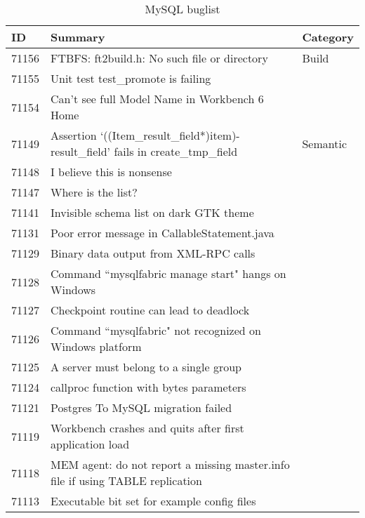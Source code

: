 \begin{longtable}[c]{p{1cm}p{10cm}p{1cm}}
\caption{MySQL buglist}
\label{tab:mysqlbuglist}\\
ID & Summary & Category \\
\endfirsthead
%
\endhead
%
71156 & FTBFS: ft2build.h: No such file or directory & Build \\
71155 & Unit test test\_promote is failing &  \\
71154 & Can't see full Model Name in Workbench 6 Home &  \\
71149 & Assertion `((Item\_result\_field*)item)-result\_field' fails in create\_tmp\_field & Semantic \\
71148 & I believe this is nonsense &  \\
71147 & Where is the list? &  \\
71141 & Invisible schema list on dark GTK theme &  \\
71131 & Poor error message in CallableStatement.java &  \\
71129 & Binary data output from XML-RPC calls &  \\
71128 & Command ``mysqlfabric manage start" hangs on Windows &  \\
71127 & Checkpoint routine can lead to deadlock &  \\
71126 & Command ``mysqlfabric" not recognized on Windows platform &  \\
71125 & A server must belong to a single group &  \\
71124 & callproc function with bytes parameters &  \\
71121 & Postgres To MySQL migration failed &  \\
71119 & Workbench crashes and quits after first application load &  \\
71118 & MEM agent: do not report a missing master.info file if using TABLE replication &  \\
71113 & Executable bit set for example config files &  \\

\end{longtable}
